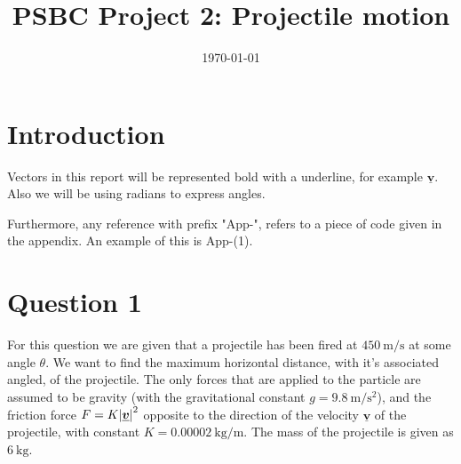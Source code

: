 \documentclass[12pt]{article}
\title{\vspace{-60pt}PSBC Project 2: Projectile motion}
\date{\today}
\newcommand{\vect}[1]{\underline{\boldsymbol{#1}}}
\begin{document}
\maketitle

\section*{Introduction}
Vectors in this report will be represented bold with a underline, for example $\vect{v}$. Also we will be using radians to express angles.

Furthermore, any reference with prefix "App-", refers to a piece of code given in the appendix. An example of this is App-(1).

\section{Question 1}
For this question we are given that a projectile has been fired at $\SI{450}{\metre\per\second}$ at some angle $\theta$. We want to find the maximum horizontal distance, with it's associated angled, of the projectile. The only forces that are applied to the particle are assumed to be gravity (with the gravitational constant $g=\SI{9.8}{\meter\per\second\tothe{2}}$), and the friction force $F=K\abs{\vect{v}}^2$ opposite to the direction of the velocity $\vect{v}$ of the projectile, with constant $K=\SI{0.00002}{\kilo\gram\per\meter}$. The mass of the projectile is given as $\SI{6}{\kilo\gram}$.
\end{document}
